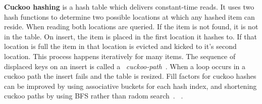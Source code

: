\textbf{Cuckoo hashing} is a hash table which delivers
constant-time reads. It uses two hash functions to determine
two possible locations at which any hashed item can reside.
When reading both locations are queried. If the item is not
found, it is not in the table. On insert, the item is placed
in the first location it hashes to. If that location is full
the item in that location is evicted and kicked to it's
second location.  This process happens iteratively for many
items. The sequence of displaced keys on an insert is called
a ~\textit{cuckoo-path}~\cite{cuckoo-improvements}. When a
loop occurs in a cuckoo path the insert fails and the table
is resized. Fill factors for cuckoo hashes can be improved
by using associative buckets for each hash index, and
shortening cuckoo paths by using BFS rather than radom
search~\cite{cuckoo-improvements}. ~.